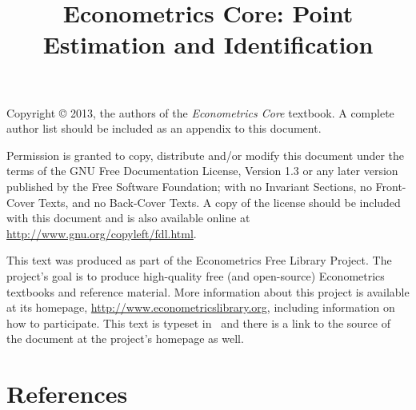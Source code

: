 \documentclass[nofonts]{tufte-latex/tufte-handout}
\title{Econometrics Core: Point Estimation and Identification}
\begin{document}
\maketitle

\bigskip\noindent%
Copyright © 2013, the authors of the \textit{Econometrics Core}
textbook.  A complete author list should be included as an appendix to
this document.

Permission is granted to copy, distribute and/or modify this document
under the terms of the GNU Free Documentation License, Version 1.3 or
any later version published by the Free Software Foundation; with no
Invariant Sections, no Front-Cover Texts, and no Back-Cover Texts.  A
copy of the license should be included with this document and is also
available online at \url{http://www.gnu.org/copyleft/fdl.html}.

This text was produced as part of the Econometrics Free Library
Project.  The project's goal is to produce high-quality free (and
open-source) Econometrics textbooks and reference material.  More
information about this project is available at its homepage,
\url{http://www.econometricslibrary.org}, including information on how
to participate.  This text is typeset in \XeLaTeX\ and there is a link
to the source of the document at the project's homepage as well.

%
\tableofcontents













% 

\part*{References}%

\end{document}
